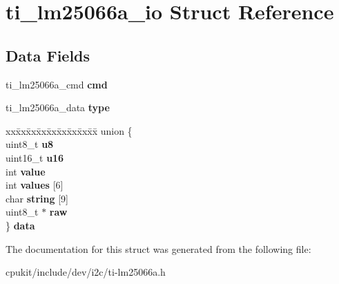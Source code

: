 \hypertarget{structti__lm25066a__io}{}\section{ti\+\_\+lm25066a\+\_\+io Struct Reference}
\label{structti__lm25066a__io}
\subsection*{Data Fields}
\begin{DoxyCompactItemize}
\item 
\mbox{\label{structti__lm25066a__io_a97d2aa248ad332535ef292cbe0dfb0cd}} 
ti\+\_\+lm25066a\+\_\+cmd {\bfseries cmd}
\item 
\mbox{\label{structti__lm25066a__io_a3fdf8765ef1e002d43d87486175e04a5}} 
ti\+\_\+lm25066a\+\_\+data {\bfseries type}
\item 
\mbox{\label{structti__lm25066a__io_a1a4230479d40724780e4c53a02338832}} 
\begin{tabbing}
xx\=xx\=xx\=xx\=xx\=xx\=xx\=xx\=xx\=\kill
union \{\\
\>uint8\_t {\bfseries u8}\\
\>uint16\_t {\bfseries u16}\\
\>int {\bfseries value}\\
\>int {\bfseries values} \mbox{[}6\mbox{]}\\
\>char {\bfseries string} \mbox{[}9\mbox{]}\\
\>uint8\_t $\ast$ {\bfseries raw}\\
\} {\bfseries data}\\

\end{tabbing}\end{DoxyCompactItemize}


The documentation for this struct was generated from the following file\+:\begin{DoxyCompactItemize}
\item 
cpukit/include/dev/i2c/ti-\/lm25066a.\+h\end{DoxyCompactItemize}
